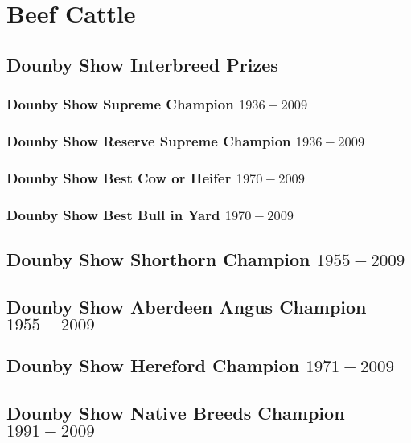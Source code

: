 \chapter{Beef Cattle}
\section[Interbreed]{Dounby Show Interbreed Prizes}
\subsection[Supreme Champion]{Dounby Show Supreme Champion $1936 - 2009$}
\small

\normalsize
\newpage
\subsection[Reserve Champion]{Dounby Show Reserve Supreme Champion $1936 - 2009$}
\small

\normalsize
\newpage
\subsection[Best Cow or Heifer]{Dounby Show Best Cow or Heifer $1970 - 2009$}
\small

\normalsize
\newpage
\subsection[Best Bull in Yard]{Dounby Show Best Bull in Yard $1970 - 2009$}
\small

\normalsize
\newpage
\section[Shorthorn Champion]{Dounby Show Shorthorn Champion $1955 - 2009$}
\small

\normalsize
\newpage
\section[Aberdeen Angus Champion]{Dounby Show Aberdeen Angus Champion $1955 - 2009$}
\small

\normalsize
\newpage
\section[Hereford Champion]{Dounby Show Hereford Champion $1971 - 2009$}
\small

\normalsize
\newpage
\section[Native Breeds Champion]{Dounby Show Native Breeds Champion $1991 - 2009$}
\small

\normalsize
\newpage

